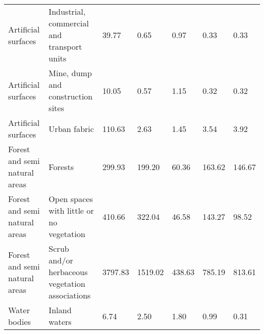 \begin{table}[]
{\begin{tabular}{lllllll}
Artificial surfaces           & Industrial, commercial and transport units      & 39.77            & 0.65                                                       & 0.97                                                     & 0.33                                                     & 0.33            \\
Artificial surfaces           & Mine, dump and construction sites               & 10.05            & 0.57                                                       & 1.15                                                     & 0.32                                                     & 0.32            \\
Artificial surfaces           & Urban fabric                                    & 110.63           & 2.63                                                       & 1.45                                                     & 3.54                                                     & 3.92            \\
Forest and semi natural areas & Forests                                         & 299.93           & 199.20                                                     & 60.36                                                    & 163.62                                                   & 146.67          \\
Forest and semi natural areas & Open spaces with little or no vegetation        & 410.66           & 322.04                                                     & 46.58                                                    & 143.27                                                   & 98.52           \\
Forest and semi natural areas & Scrub and/or herbaceous vegetation associations & 3797.83          & 1519.02                                                    & 438.63                                                   & 785.19                                                   & 813.61          \\
Water bodies                  & Inland waters                                   & 6.74             & 2.50                                                       & 1.80                                                     & 0.99                                                     & 0.31           
\end{tabular}%
}
\end{table}


